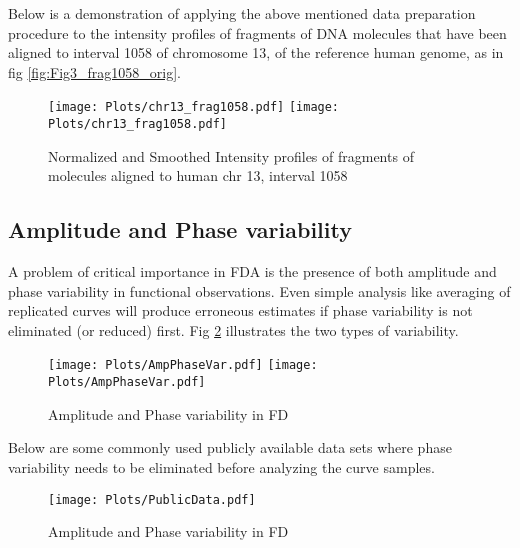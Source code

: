 Below is a demonstration of applying the above mentioned data preparation procedure to the intensity profiles of fragments of DNA molecules that have been aligned to interval 1058 of chromosome 13, of the reference human genome, as in fig \ref{fig:Fig3_frag1058_orig}.
\begin{figure}[H]
\begin{center}
\texttt{[image: Plots/chr13\_frag1058.pdf]}
\texttt{[image: Plots/chr13\_frag1058.pdf]}
\end{center}
\caption{Normalized and Smoothed Intensity profiles of fragments of molecules aligned to human chr 13, interval 1058}
\label{fig:Fig3_frag1058_norm}
\end{figure}


\subsection{Amplitude and Phase variability} \label{Sec_AmpPhase}
A problem of critical importance in FDA is the presence of both amplitude and phase variability in functional observations. Even simple analysis like averaging of replicated curves will produce erroneous estimates if phase variability is not eliminated (or reduced) first. Fig \ref{fig:Fig3_AmpPhase} illustrates the two types of variability. 
\begin{figure}[H]
\begin{center}
\texttt{[image: Plots/AmpPhaseVar.pdf]}
\texttt{[image: Plots/AmpPhaseVar.pdf]}
\end{center}
\caption{Amplitude and Phase variability in FD}
\label{fig:Fig3_AmpPhase}
\end{figure}
Below are some commonly used publicly available data sets where phase variability needs to be eliminated before analyzing the curve samples. 
\begin{figure}[H]
\begin{center}
\texttt{[image: Plots/PublicData.pdf]}
\end{center}
\caption{Amplitude and Phase variability in FD}
\label{fig:Fig3_growthM}
\end{figure}

